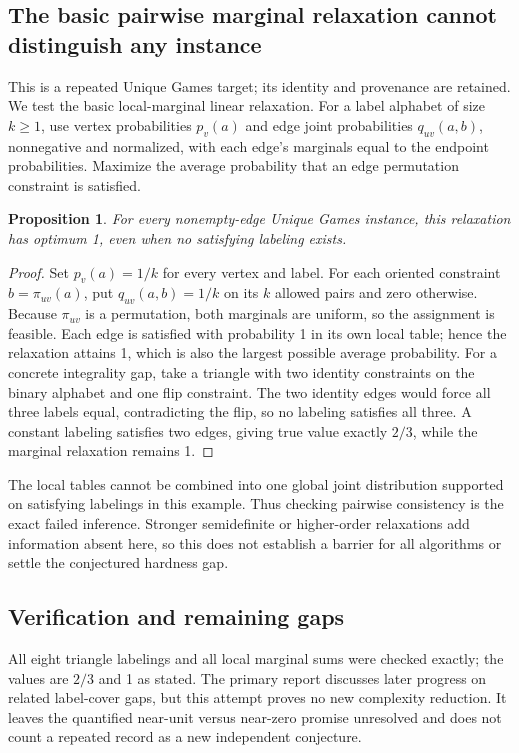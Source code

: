 \documentclass[11pt]{article}
\newtheorem{proposition}{Proposition}
\begin{document}
\subsection{The basic pairwise marginal relaxation cannot distinguish any instance}
This is a repeated Unique Games target; its identity and provenance are retained. We test the basic local-marginal linear relaxation. For a label alphabet of size $k\ge1$, use vertex probabilities $p_v(a)$ and edge joint probabilities $q_{uv}(a,b)$, nonnegative and normalized, with each edge's marginals equal to the endpoint probabilities. Maximize the average probability that an edge permutation constraint is satisfied.
\begin{proposition}
For every nonempty-edge Unique Games instance, this relaxation has optimum 1, even when no satisfying labeling exists.
\end{proposition}
\begin{proof}
Set $p_v(a)=1/k$ for every vertex and label. For each oriented constraint $b=\pi_{uv}(a)$, put $q_{uv}(a,b)=1/k$ on its $k$ allowed pairs and zero otherwise. Because $\pi_{uv}$ is a permutation, both marginals are uniform, so the assignment is feasible. Each edge is satisfied with probability 1 in its own local table; hence the relaxation attains 1, which is also the largest possible average probability.
For a concrete integrality gap, take a triangle with two identity constraints on the binary alphabet and one flip constraint. The two identity edges would force all three labels equal, contradicting the flip, so no labeling satisfies all three. A constant labeling satisfies two edges, giving true value exactly $2/3$, while the marginal relaxation remains 1.
\end{proof}
The local tables cannot be combined into one global joint distribution supported on satisfying labelings in this example. Thus checking pairwise consistency is the exact failed inference. Stronger semidefinite or higher-order relaxations add information absent here, so this does not establish a barrier for all algorithms or settle the conjectured hardness gap.
\subsection{Verification and remaining gaps}
All eight triangle labelings and all local marginal sums were checked exactly; the values are $2/3$ and 1 as stated. The primary report discusses later progress on related label-cover gaps, but this attempt proves no new complexity reduction. It leaves the quantified near-unit versus near-zero promise unresolved and does not count a repeated record as a new independent conjecture.
\end{document}
